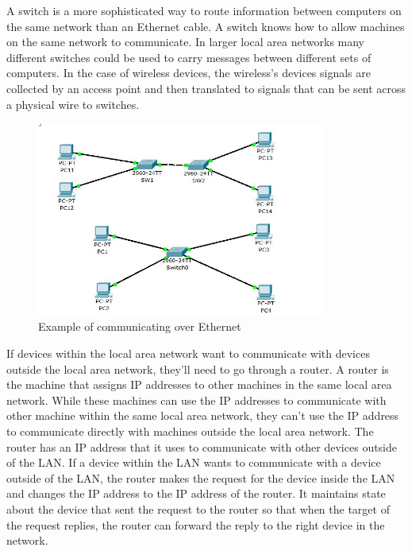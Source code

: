 A switch is a more sophisticated way to route information between computers on the same network than an Ethernet cable. A switch knows how to allow machines on the same network to communicate. In larger local area networks many different switches could be used to carry messages between different sets of computers. In the case of wireless devices, the wireless’s devices signals are collected by an access point and then translated to signals that can be sent across a physical wire to switches. \\

\begin{figure}
	\centering
	\includegraphics[width=0.85\textwidth]{lectures/images/switchExample.png}
	\caption{Example of communicating over Ethernet}
	\label{fig:windows:file}
\end{figure}

If devices within the local area network want to communicate with devices outside the local area network, they’ll need to go through a router. A router is the machine that assigns IP addresses to other machines in the same local area network. While these machines can use the IP addresses to communicate with other machine within the same local area network, they can’t use the IP address to communicate directly with machines outside the local area network. The router has an IP address that it uses to communicate with other devices outside of the LAN. If a device within the LAN wants to communicate with a device outside of the LAN, the router makes the request for the device inside the LAN and changes the IP address to the IP address of the router. It maintains state about the device that sent the request to the router so that when the target of the request replies, the router can forward the reply to the right device in the network. \\


